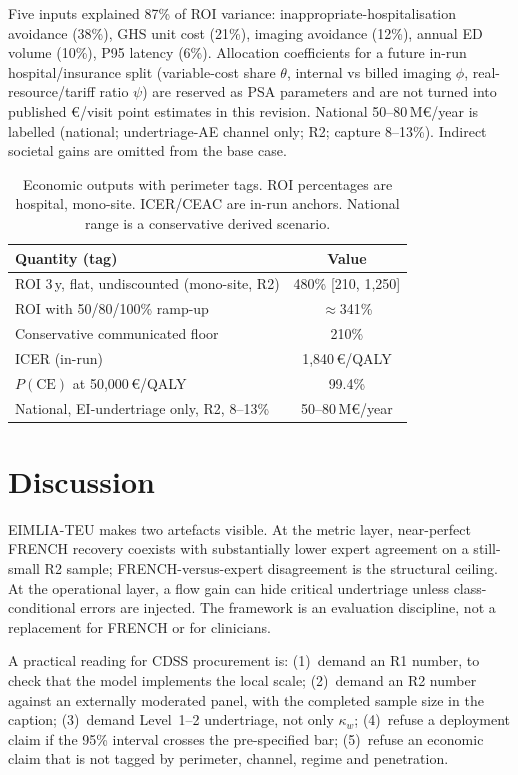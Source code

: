 \documentclass[conference]{IEEEtran}
\begin{document}
Five inputs explained 87\% of ROI variance: inappropriate-hospitalisation avoidance (38\%), GHS unit cost (21\%), imaging avoidance (12\%), annual ED volume (10\%), P95 latency (6\%). Allocation coefficients for a future in-run hospital/insurance split (variable-cost share $\theta$, internal vs billed imaging $\phi$, real-resource/tariff ratio $\psi$) are reserved as PSA parameters and are not turned into published €/visit point estimates in this revision. National 50--80\,M€/year is labelled (national; undertriage-AE channel only; R2; capture 8--13\%). Indirect societal gains are omitted from the base case.

\begin{table}[!htbp]
\caption{Economic outputs with perimeter tags. ROI percentages are hospital, mono-site. ICER/CEAC are in-run anchors. National range is a conservative derived scenario.}
\label{tab:econ}
\centering
\scriptsize
\begin{tabular}{@{}lc@{}}
\toprule
Quantity (tag) & Value \\
\midrule
ROI 3\,y, flat, undiscounted (mono-site, R2) & 480\% [210, 1{,}250] \\
ROI with 50/80/100\% ramp-up & $\approx$341\% \\
Conservative communicated floor & 210\% \\
ICER (in-run) & 1{,}840\,€/QALY \\
$P(\mathrm{CE})$ at 50{,}000\,€/QALY & 99.4\% \\
National, EI-undertriage only, R2, 8--13\% & 50--80\,M€/year \\
\bottomrule
\end{tabular}
\end{table}

\section{Discussion}
EIMLIA-TEU makes two artefacts visible. At the metric layer, near-perfect FRENCH recovery coexists with substantially lower expert agreement on a still-small R2 sample; FRENCH-versus-expert disagreement is the structural ceiling. At the operational layer, a flow gain can hide critical undertriage unless class-conditional errors are injected. The framework is an evaluation discipline, not a replacement for FRENCH or for clinicians.

A practical reading for CDSS procurement is: (1)~demand an R1 number, to check that the model implements the local scale; (2)~demand an R2 number against an externally moderated panel, with the completed sample size in the caption; (3)~demand Level~1--2 undertriage, not only $\kappa_w$; (4)~refuse a deployment claim if the 95\% interval crosses the pre-specified bar; (5)~refuse an economic claim that is not tagged by perimeter, channel, regime and penetration.
\end{document}
